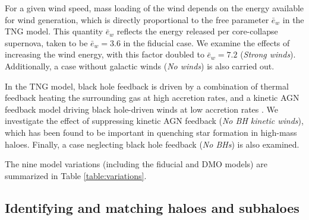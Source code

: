 \documentclass[fleqn,usenatbib]{mnras}
\begin{document}
For a given wind speed, mass loading of the wind depends on the energy available for wind generation, which
is directly proportional to the free parameter $\bar e_w$ in the TNG model.
This quantity $\bar e_w$ reflects the energy released per core-collapse supernova, taken to be $\bar e_w=3.6$ in the fiducial case.
We examine the effects of increasing the wind energy, with this factor doubled to $\bar e_w=7.2$ (\emph{Strong winds}).
Additionally, a case without galactic winds (\emph{No winds}) is also carried out.

In the TNG model, black hole feedback is driven by a combination of thermal feedback heating the surrounding gas at high accretion rates, and a kinetic AGN feedback model driving black hole-driven winds at low accretion rates \citep{Weinberger17v465}.
We investigate the effect of suppressing kinetic AGN feedback (\emph{No BH kinetic winds}), which has been found to be important in quenching star formation in high-mass haloes.
Finally, a case neglecting black hole feedback (\emph{No BHs}) is also examined.

The nine model variations (including the fiducial and DMO models) are summarized in Table \ref{table:variations}.



\subsection{Identifying and matching haloes and subhaloes}
\end{document}
